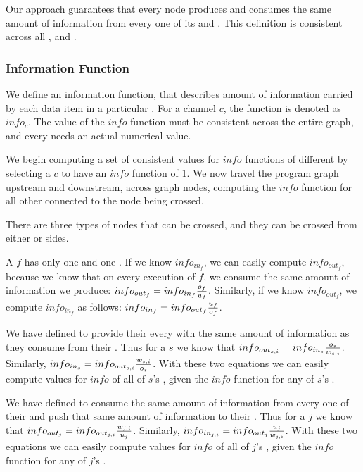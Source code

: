 Our approach guarantees that every node produces and consumes the
same amount of information from every one of its {\Input} and
{\Output} {\Channels}.  This definition is consistent across all
{\filters}, {\splitters} and {\joiners}.

\subsubsection{Information Function}

We define an information function, that describes amount of
information carried by each data item in a particular {\Channel}.
For a channel $c$, the function is denoted as $info_c$.   The
value of the $info$ function must be consistent across the entire
{\StreamIt} graph, and every {\Channel} needs an actual numerical
value.

We begin computing a set of consistent values for $info$ functions
of different {\Channels} by selecting a {\Channel} $c$ to have an
$info$ function of 1.  We now travel the program graph upstream
and downstream, across graph nodes, computing the $info$ function
for all other {\Channels} connected to the node being crossed.

There are three types of nodes that can be crossed, and they can
be crossed from either {\Input} or {\Output} sides.

\subsubsubsection{\filters}

A {\filter} $f$ has only one {\Input} and one {\Output} {\Channel}.  If we
know $info_{in_f}$, we can easily compute $info_{out_f}$, because
we know that on every execution of $f$, we consume the same amount
of information we produce:  $info_{out_f} = info_{in_f} {o_f \over
u_f}$.  Similarly, if we know $info_{out_f}$, we compute
$info_{in_f}$ as follows:  $info_{in_f} = info_{out_f} {u_f \over
o_f}$.

\subsubsubsection{\splitters}

We have defined {\splitters} to provide their every {\Output} {\Channel}
with the same amount of information as they consume from their
{\Input} {\Channel}.  Thus for a {\splitter} $s$ we know that
$info_{out_{s,i}} = info_{in_s} {o_s \over w_{s,i}}$.  Similarly,
$info_{in_s} = info_{out_{s,i}} {w_{s,i} \over o_s}$.  With these
two equations we can easily compute values for $info$ of all of
$s$'s {\Channels}, given the $info$ function for any of $s$'s
{\Channels}.

\subsubsubsection{\joiners}

We have defined {\joiners} to consume the same amount of information
from every one of their {\Input} {\Channels} and push that same amount
of information to their {\Output} {\Channel}. Thus for a {\joiner} $j$
we know that $info_{out_j} = info_{out_{j,i}} {w_{j,i} \over
u_j}$. Similarly, $info_{in_{j,i}} = info_{out_j} {u_j \over
w_{j,i}}$. With these two equations we can easily compute values
for $info$ of all of $j$'s {\Channels}, given the $info$ function
for any of $j$'s {\Channels}.

